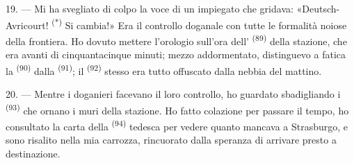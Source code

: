 19. --- Mi ha svegliato di colpo la voce di un impiegato che gridava:
«Deutsch-Avricourt! \textsuperscript{(*)} Si cambia!» Era il controllo doganale con
tutte le formalità noiose della frontiera. Ho dovuto mettere l'orologio sull'ora
dell' \textsuperscript{(89)} della stazione, che era avanti di
cinquantacinque minuti; mezzo addormentato, distinguevo a fatica la  \textsuperscript{(90)} dalla  \textsuperscript{(91)}; il
 \textsuperscript{(92)} stesso era tutto offuscato dalla nebbia del
mattino.

20. --- Mentre i doganieri facevano il loro controllo, ho guardato sbadigliando i
 \textsuperscript{(93)} che ornano i muri della stazione. Ho fatto
colazione per passare il tempo, ho consultato la carta della 
\textsuperscript{(94)} tedesca per vedere quanto mancava a Strasburgo, e sono risalito
nella mia carrozza, rincuorato dalla speranza di arrivare presto a destinazione.
\VUsaut{6.0mm}
\VUfilet{22mm}
